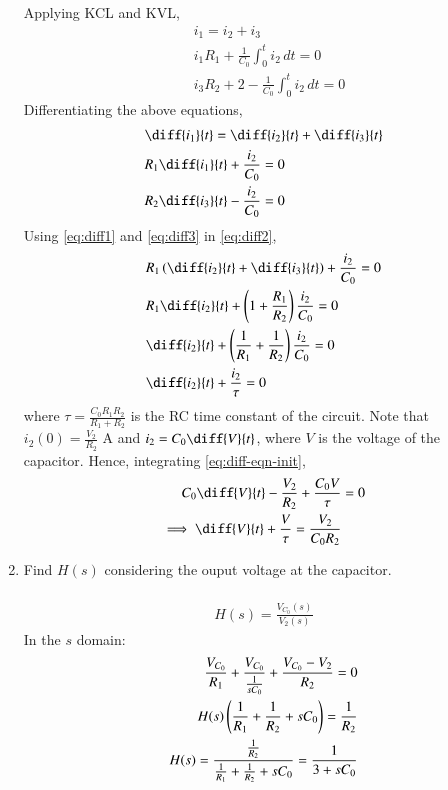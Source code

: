 \documentclass[journal,12pt,twocolumn]{IEEEtran}
\renewcommand\thesection{\arabic{section}}
\begin{document}
\begin{enumerate}[label=\arabic*.,ref=\thesection.\theenumi]
Applying KCL and KVL,
\begin{align}
	&i_1 = i_2 + i_3 \\
	&i_1R_1 + \frac{1}{C_0}\int_0^ti_2\, dt = 0 \\
	&i_3R_2 + 2 - \frac{1}{C_0}\int_0^ti_2\, dt = 0
\end{align}
Differentiating the above equations,
\begin{align}
	&\diff{i_1}{t} = \diff{i_2}{t} + \diff{i_3}{t} \label{eq:diff1}\\
	&R_1\diff{i_1}{t} + \frac{i_2}{C_0} = 0 \label{eq:diff2}\\
	&R_2\diff{i_3}{t} - \frac{i_2}{C_0} = 0 
	\label{eq:diff3}
\end{align}
Using \eqref{eq:diff1} and \eqref{eq:diff3} in \eqref{eq:diff2},
\begin{align}
	&R_1\brak{\diff{i_2}{t} + \diff{i_3}{t}} + \frac{i_2}{C_0} = 0 \\
	&R_1\diff{i_2}{t} + \brak{1 + \frac{R_1}{R_2}}\frac{i_2}{C_0} = 0 \\
	&\diff{i_2}{t} + \brak{\frac{1}{R_1} + \frac{1}{R_2}}\frac{i_2}{C_0} = 0 \\
	&\diff{i_2}{t} + \frac{i_2}{\tau} = 0
	\label{eq:diff-eqn-init}
\end{align}
where $\tau = \frac{C_0R_1R_2}{R_1 + R_2}$ is the RC time 
constant of the circuit. Note that $i_2(0) = \frac{V_2}{R_2}$ A and 
$i_2 = C_0\diff{V}{t}$, where $V$ is the voltage of the capacitor. 
Hence, integrating \eqref{eq:diff-eqn-init},
\begin{align}
	C_0\diff{V}{t} - \frac{V_2}{R_2} + \frac{C_0V}{\tau} &= 0 \\
	\implies \diff{V}{t} + \frac{V}{\tau} = \frac{V_2}{C_0R_2}
	\label{eq:diff-eqn}
\end{align}
\item Find $H(s)$ considering the ouput voltage at the capacitor.\\
\solution\\
\begin{align}
		H(s) = \frac{V_{C_0}(s)}{V_2(s)}
\end{align}
In the $s$ domain:
\begin{align}
	\frac{V_{C_0}}{R_1} + \frac{V_{C_0}}{\frac{1}{sC_0}} + \frac{V_{C_0} - V_2}{R_2} = 0 \\
	H(s)\left(\frac{1}{R_1} + \frac{1}{R_2} + sC_0\right) = \frac{1}{R_2} \\
	H(s) = \frac{\frac{1}{R_2}}{\frac{1}{R_1} + \frac{1}{R_2} + sC_0} = \dfrac{1}{3 + sC_0}
	\label{eq:Hs}
\end{align}

\end{enumerate}
\end{document}

